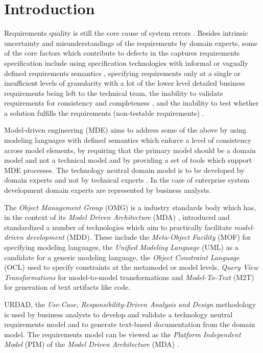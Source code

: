 \section{Introduction}

Requirements quality is still the core cause of system errors \cite{heck_experiences_2008}. Besides intrinsic uncertainty and misunderstandings of the requirements by domain experts, some of the core factors which contribute to defects in the captures requirements specification include using specification technologies with informal or vagually defined requirements semantics \cite{ferguson_empirical_2006}, specifying requirements only at a single or insufficient levels of granularity with a lot of the lower level detailed business requirements being left to the technical team, the inability to validate requirements for consistency and completeness \cite{somebodyPleaseFindASuitableReference}, and the inability to test whether a solution fulfills the requirements (non-testable requirements) \cite{bashardoust-tajali_extracting_2008}.

Model-driven engineering (MDE) aims to address some of the above by using modeling languages with defined semantics which enforce a level of consistency across model elements, by requiring that the primary model should be a domain model and not a technical model and by providing a set of tools which support MDE processes. The technology neutral domain model is to be developed by domain experts and not by technical experts \cite{asnina_computation_2010}. In the case of enterprise system development domain experts are represented by business analysts.

The {\em Object Management Group} (OMG) is a industry standards body which has, in the context of its {\em Model Driven Architecture} (MDA) \cite{siegel_developing_2001}, introduced and standardized a number of technologies which aim to practically facilitate {\em model-driven development} (MDD). These include the {\em Meta-Object Facility} (MOF) for specifying modeling languages, the {\em Unified Modeling Language} (UML) as a candidate for a generic modeling language, the {\em Object Constraint Language} (OCL) used to specify constraints at the metamodel or model levels, {\em Query View Transformations} for model-to-model transformations and {\em Model-To-Text} (M2T) for generation of text artifacts like code. 

URDAD, the {\em Use-Case, Responsibility-Driven Analysis and Design} \cite{solms_technology_2007} methodology is used by business analysts to develop and validate a technology neutral requirements model and to generate text-based documentation from the domain model. The requirements model can be viewed as the {\em Platform Independent Model} (PIM) of the {\em Model Driven Architecture} (MDA) \cite{solms_urdad_2010}.

